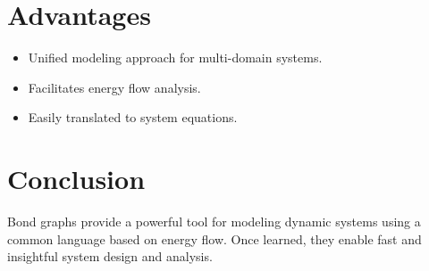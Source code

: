 \documentclass[12pt]{article}
\begin{document}
\section*{Advantages}
\begin{itemize}
    \item Unified modeling approach for multi-domain systems.
    \item Facilitates energy flow analysis.
    \item Easily translated to system equations.
\end{itemize}

\section*{Conclusion}
Bond graphs provide a powerful tool for modeling dynamic systems using a common language based on energy flow. Once learned, they enable fast and insightful system design and analysis.
\end{document}
